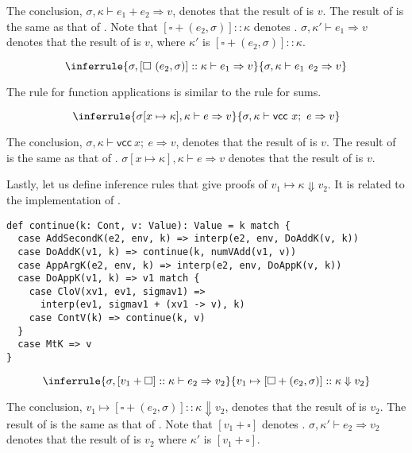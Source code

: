 The conclusion, $\sigma,\kappa\vdash e_1+e_2\Rightarrow v$, denotes that the
result of  is $v$. The result
of  is the same as that of
. Note that
$[\square+(e_2,\sigma)]::\kappa$ denotes .
$\sigma,\kappa'\vdash e_1\Rightarrow v$ denotes that the result of
 is $v$, where $\kappa'$ is
$[\square+(e_2,\sigma)]::\kappa$.

\[
\inferrule
{ \sigma,[\square\ (e_2,\sigma)]::\kappa\vdash e_1\Rightarrow v }
{ \sigma,\kappa\vdash e_1\ e_2\Rightarrow v }
\]

The rule for function applications is similar to the rule for sums.

\[
\inferrule
{ \sigma[x\mapsto\kappa],\kappa\vdash e\Rightarrow v }
{ \sigma,\kappa\vdash \textsf{vcc}\ x;\ e\Rightarrow v }
\]

The conclusion, $\sigma,\kappa\vdash \textsf{vcc}\ x;\ e\Rightarrow v$, denotes that
the result of  is $v$. The result
of  is the same as that of
. $\sigma[x\mapsto\kappa],\kappa\vdash
e\Rightarrow v$ denotes that the result of  is $v$.

Lastly, let us define inference rules that give proofs of
$v_1\mapsto\kappa\Downarrow v_2$. It is related to the implementation of
.

\begin{verbatim}
def continue(k: Cont, v: Value): Value = k match {
  case AddSecondK(e2, env, k) => interp(e2, env, DoAddK(v, k))
  case DoAddK(v1, k) => continue(k, numVAdd(v1, v))
  case AppArgK(e2, env, k) => interp(e2, env, DoAppK(v, k))
  case DoAppK(v1, k) => v1 match {
    case CloV(xv1, ev1, sigmav1) =>
      interp(ev1, sigmav1 + (xv1 -> v), k)
    case ContV(k) => continue(k, v)
  }
  case MtK => v
}
\end{verbatim}

\[
\inferrule
{ \sigma,[v_1+\square]::\kappa\vdash e_2\Rightarrow v_2 }
{ v_1\mapsto[\square+(e_2,\sigma)]::\kappa\Downarrow v_2 }
\]

The conclusion, $v_1\mapsto[\square+(e_2,\sigma)]::\kappa\Downarrow v_2$, denotes
that the result of 
is $v_2$. The result of  is the same as that of . Note that $[v_1+\square]$ denotes .
$\sigma,\kappa'\vdash e_2\Rightarrow v_2$ denotes that the result of
 is $v_2$ where $\kappa'$ is $[v_1+\square]$.

